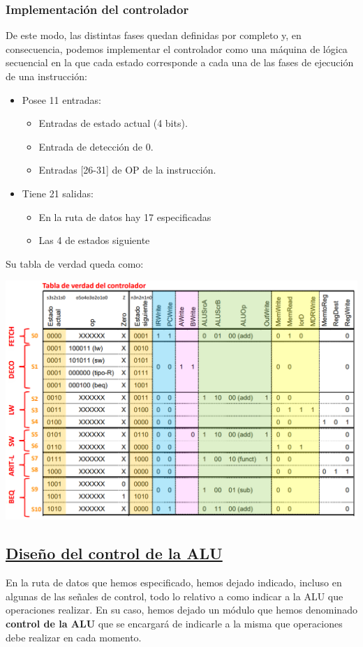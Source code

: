 \documentclass[a4paper,10pt]{book}
\begin{document}
\subsubsection*{Implementación del controlador}
De este modo, las distintas fases quedan definidas por completo y, en consecuencia, podemos implementar el controlador como una máquina de lógica secuencial en la que cada estado corresponde a cada una de las fases de ejecución de una instrucción:
\begin{itemize}
\item Posee 11 entradas:
	\begin{itemize}
	\item Entradas de estado actual (4 bits).
	\item Entrada de detección de 0.
	\item Entradas [26-31] de OP de la instrucción.
	\end{itemize}
\item Tiene 21 salidas:
	\begin{itemize}
	\item En la ruta de datos hay 17 especificadas
	\item Las 4 de estados siguiente
	\end{itemize}
\end{itemize}
Su tabla de verdad queda como:
\begin{center}
\includegraphics[scale=0.5]{tabla de verdad controlador}
\end{center}

\subsection*{\underline{Diseño del control de la ALU}}
En la ruta de datos que hemos especificado, hemos dejado indicado, incluso en algunas de las señales de control, todo lo relativo a como indicar a la ALU que operaciones realizar. En su caso, hemos dejado un módulo que hemos denominado \textbf{control de la ALU} que se encargará de indicarle a la misma que operaciones debe realizar en cada momento.
\end{document}
